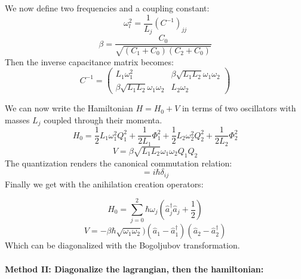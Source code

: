 \documentclass[12pt]{article}
\numberwithin{equation}{subsection}
\newcommand\ask[1]{
{%
}
}
\newcommand\page[1]{
{
}
}
\begin{document}
We now define two frequencies and a coupling constant:
\begin{equation}
    \omega_l^2 = \frac{1}{L_j} (C^{-1})_{jj}
\end{equation}
\begin{equation}
    \beta = \frac{C_0}{\sqrt{(C_1+C_0)(C_2+C_0)}}
\end{equation}
Then the inverse capacitance matrix becomes:
\begin{equation}
    C^{-1} = \begin{pmatrix}
    L_1 \omega_1^2 & \beta \sqrt{L_1 L_2} \omega_1\omega_2\\
    \beta \sqrt{L_1 L_2} \omega_1\omega_2 & L_2\omega_2
    \end{pmatrix}
\end{equation}

We can now write the Hamiltonian $H= H_0 +V$ in terms of two oscillators with masses $L_j$ coupled through their momenta. 
\begin{equation}
   H_0 = \frac{1}{2}L_1\omega_1^2Q^2_1 + \frac{1}{2L_1}\Phi^2_1+\frac{1}{2}L_2\omega_2^2Q^2_2 + \frac{1}{2L_2}\Phi^2_2
\end{equation}
\begin{equation}
    V = \beta \sqrt{L_1L_2}\omega_1\omega_2Q_1Q_2
\end{equation}
The quantization renders the canonical commutation relation:
\begin{equation}
    [\hat Q_i, \hat \Phi _j] = i\hbar \delta_{ij}
\end{equation}
Finally we get with the anihilation creation operators:

\begin{equation}
    H_0 = \sum^2_{j=0} \hbar \omega_j \left ( \hat a_j^\dagger\hat a_j + \frac{1}{2}\right )
\end{equation}
\begin{equation}
    V = - \beta \hbar \sqrt{\omega_1\omega_2})(\hat a _1 - \hat a _1^\dagger ) (\hat a _2 - \hat a _2^\dagger)
\end{equation}
Which can be diagonalized with the Bogoljubov transformation.
\ask{O que é essa transformação?}

\page{24}

\paragraph{Method II: Diagonalize the lagrangian, then the hamiltonian: \\}
\end{document}
